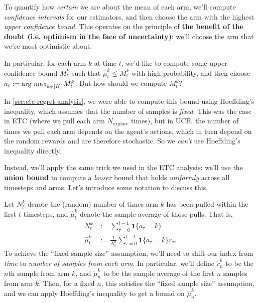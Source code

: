 \documentclass[\main/main]{subfiles}
\newcommand{\Nex}{N_{\text{explore}}}
\begin{document}
To quantify how \emph{certain} we are about the mean of each arm, we'll compute \emph{confidence intervals} for our estimators, and then choose the arm with the highest \emph{upper confidence bound}. This operates on the principle of \textbf{the benefit of the doubt (i.e. optimism in the face of uncertainty)}: we'll choose the arm that we're most optimistic about.

In particular, for each arm $k$ at time $t$, we'd like to compute some upper confidence bound $M^k_t$ such that $\hat \mu^k_t \le M^k_t$ with high probability, and then choose $a_t := \operatorname*{\textrm{arg\ max}}_{k \in [K]} M^k_t$. But how should we compute $M^k_t$?

In \autoref{sec:etc-regret-analysis}, we were able to compute this bound using Hoeffding's inequality, which assumes that the number of samples is \emph{fixed}. This was the case in ETC (where we pull each arm $\Nex$ times), but in UCB, the number of times we pull each arm depends on the agent's actions, which in turn depend on the random rewards and are therefore stochastic. So we \emph{can't} use Hoeffding's inequality directly.

Instead, we'll apply the same trick we used in the ETC analysis: we'll use the \textbf{union bound} to compute a \emph{looser} bound that holds \emph{uniformly} across all timesteps and arms. Let's introduce some notation to discuss this.

Let $N^k_t$ denote the (random) number of times arm $k$ has been pulled within the first $t$ timesteps, and $\hat \mu^k_t$ denote the sample average of those pulls. That is,
\begin{align*}
    N^k_t &:= \sum_{\tau=0}^{t-1} \mathbf{1} \{ a_\tau = k \} \\
    \hat \mu^k_t &:= \frac{1}{N^k_t} \sum_{\tau=0}^{t-1} \mathbf{1} \{ a_\tau = k \} r_\tau.
\end{align*}
To achieve the ``fixed sample size'' assumption, we'll need to shift our index from \emph{time} to \emph{number of samples from each arm}. In particular, we'll define $\tilde r^k_n$ to be the $n$th sample from arm $k$, and $\tilde \mu^k_n$ to be the sample average of the first $n$ samples from arm $k$. Then, for a fixed $n$, this satisfies the ``fixed sample size'' assumption, and we can apply Hoeffding's inequality to get a bound on $\tilde \mu^k_n$.
\end{document}
